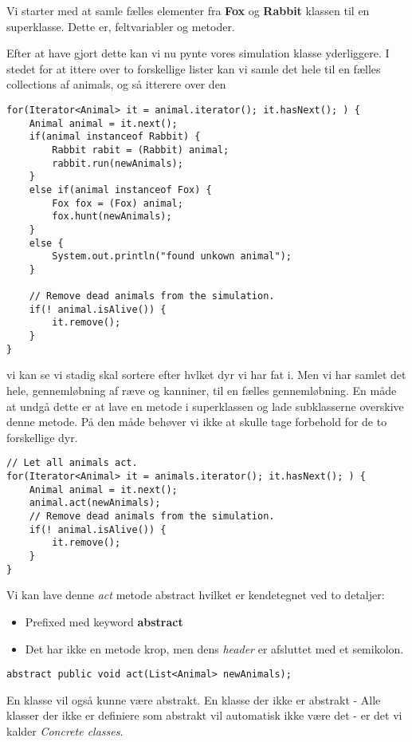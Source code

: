\documentclass{article}
\begin{document}
Vi starter med at samle fælles elementer fra \textbf{Fox} og \textbf{Rabbit} klassen til en superklasse. Dette er, feltvariabler og metoder. 

Efter at have gjort dette kan vi nu pynte vores simulation klasse yderliggere. I stedet for at ittere over to forskellige lister kan vi samle det hele til en fælles collections af animals, og så itterere over den

\begin{verbatim}
for(Iterator<Animal> it = animal.iterator(); it.hasNext(); ) {
    Animal animal = it.next();
    if(animal instanceof Rabbit) {
        Rabbit rabit = (Rabbit) animal;
        rabbit.run(newAnimals);
    }
    else if(animal instanceof Fox) {
        Fox fox = (Fox) animal;
        fox.hunt(newAnimals);
    }
    else {
        System.out.println("found unkown animal");
    }

    // Remove dead animals from the simulation.
    if(! animal.isAlive()) {
        it.remove();
    }
}
\end{verbatim}

vi kan se vi stadig skal sortere efter hvlket dyr vi har fat i. Men vi har samlet det hele, gennemløbning af ræve og kanniner, til en fælles gennemløbning. En måde at undgå dette er at lave en metode i superklassen og lade subklasserne overskive denne metode. På den måde behøver vi ikke at skulle tage forbehold for de to forskellige dyr.

\begin{verbatim}
// Let all animals act.
for(Iterator<Animal> it = animals.iterator(); it.hasNext(); ) {
    Animal animal = it.next();
    animal.act(newAnimals);
    // Remove dead animals from the simulation.
    if(! animal.isAlive()) {
        it.remove();
    }
}    
\end{verbatim}

Vi kan lave denne \textit{act} metode abstract hvilket er kendetegnet ved to detaljer:
\begin{itemize}
    \item Prefixed med keyword \textbf{abstract} 
    \item Det har ikke en metode krop, men dens \textit{header} er afsluttet med et semikolon.
\end{itemize}
\begin{verbatim}
abstract public void act(List<Animal> newAnimals);
\end{verbatim}

En klasse vil også kunne være abstrakt. En klasse der ikke er abstrakt - Alle klasser der ikke er definiere som abstrakt vil automatisk ikke være det - er det vi kalder \textit{Concrete classes}. 
\end{document}

